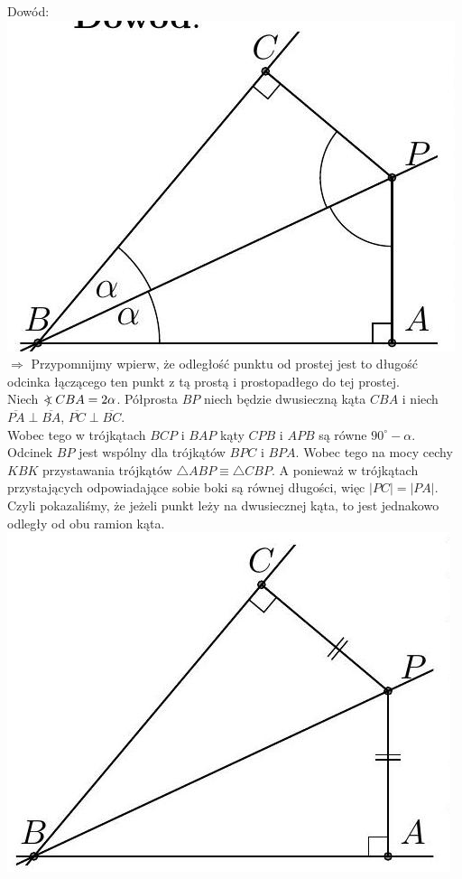 \documentclass[10pt]{article}
\newcommand\Varangle{\mathop{{<\!\!\!\!\!\text{\small)}}\:}\nolimits}
\begin{document}
Dowód:\\
\includegraphics[max width=\textwidth, center]{2024_11_21_71f62bd117d375398909g-141}\\
\(\Longrightarrow\) Przypomnijmy wpierw, że odległość punktu od prostej jest to długość odcinka łączącego ten punkt z tą prostą i prostopadłego do tej prostej.\\
Niech \(\Varangle C B A=2 \alpha\). Półprosta \(B P\) niech będzie dwusieczną kąta \(C B A\) i niech \(\overline{P A} \perp \overline{B A}\), \(\overline{P C} \perp \overline{B C}\).\\
Wobec tego w trójkątach \(B C P\) i \(B A P\) kąty \(C P B\) i \(A P B\) są równe \(90^{\circ}-\alpha\). Odcinek \(B P\) jest wspólny dla trójkątów \(B P C\) i \(B P A\). Wobec tego na mocy cechy \(K B K\) przystawania trójkątów \(\triangle A B P \equiv \triangle C B P\). A ponieważ w trójkątach przystających odpowiadające sobie boki są równej długości, więc \(|P C|=|P A|\). Czyli pokazaliśmy, że jeżeli punkt leży na dwusiecznej kąta, to jest jednakowo odległy od obu ramion kąta.\\
\includegraphics[max width=\textwidth, center]{2024_11_21_71f62bd117d375398909g-142(1)}\\
\end{document}
